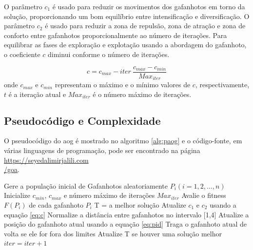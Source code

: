 O parâmetro $c_1$ é usado para reduzir os movimentos dos gafanhotos em torno da solução, proporcionando um bom equilíbrio entre intensificação e diversificação. O parâmetro $c_2$ é usado para reduzir a zona de repulsão, zona de atração e zona de conforto entre gafanhotos proporcionalmente ao número de iterações. Para equilibrar as fases de exploração e explotação usando a abordagem do gafanhoto, o coeficiente $c$ diminui conforme o número de iterações.

\begin{equation}
  \label{eq:c}
  c = c_{max} - iter~\frac{c_{max} - c_{min}}{Max_{iter}}
\end{equation}
onde $c_{max}$ e $c_{min}$ representam o máximo e o mínimo valores de $c$, respectivamente, $t$ é a iteração atual e $Max_{iter}$ é o número máximo de iterações.

\subsection{Pseudocódigo e Complexidade}
\label{subsubsec:pseudocodigo_comlexidade}

O pseudocódigo do \ac{aog} é mostrado no algoritmo \ref{alg:paog} e o código-fonte, em várias linguagens de programação, pode ser encontrado na página \href{https://seyedalimirjalili.com/goa}{https://seyedalimirjalili.com\\/goa}.

\begin{algorithm}[H]
  \caption{Pseudocódigo do Algoritmo de
    Otimização do Gafanhoto (AOG)}
  \label{alg:paog}
  \SetAlgoLined
  \begin{algorithmic}[1]
    \STATE Gere a população inicial de Gafanhotos aleatoriamente $P_i(i=1,2,...,n)$
    \STATE Inicialize $c_{min}$, $c_{max}$ e número máximo de iterações $Max_{iter}$
    \STATE Avalie o fitness $F(P_i)$ de cada gafanhoto $P_i$
    \STATE T = a melhor solução
    \STATE Atualize $c_1$ e $c_2 $ usando a equação \ref{eq:c}
    \STATE Normalize a distância entre gafanhotos no intervalo [1,4]
    \STATE Atualize a posição do gafanhoto atual usando a equação \ref{eq:pid}
    \STATE Traga o gafanhoto atual de volta se ele for fora dos limites
    \ENDFOR
    \STATE Atualize T se houver uma solução melhor
    \STATE $iter = iter + 1$
    \ENDWHILE
    \STATE {}
  \end{algorithmic}
\end{algorithm}

